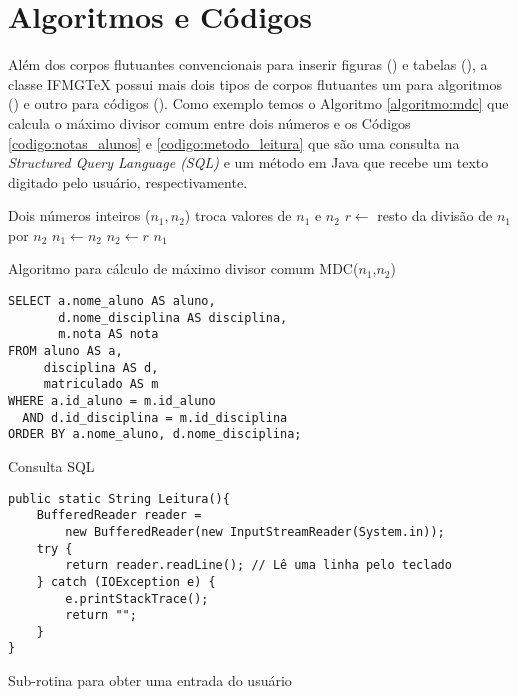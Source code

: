 \section{Algoritmos e Códigos} \label{secao:algoritmos_e_codigos}

Além dos corpos flutuantes convencionais para inserir figuras () e tabelas (), a classe {IFMG\TeX} possui mais dois tipos de corpos flutuantes um para algoritmos () e outro para códigos (). Como exemplo temos o Algoritmo \ref{algoritmo:mdc} que calcula o máximo divisor comum entre dois números e os Códigos \ref{codigo:notas_alunos} e \ref{codigo:metodo_leitura} que são uma consulta na \textit{Structured Query Language (SQL)} e um método em Java que recebe um texto digitado pelo usuário, respectivamente.

\begin{algoritmo}[!htb]
\begin{algorithmic}[1]
 \Require Dois números inteiros ($n_1, n_2$)
  
   \State troca valores de $n_1$ e $n_2$
 \EndIf
 \Repeat
   \State $r \leftarrow$ resto da divisão de $n_1$ por $n_2$
   \State $n_1 \leftarrow n_2$
   \State $n_2 \leftarrow r$
 \Return $n_1$
\end{algorithmic}
\caption{Algoritmo para cálculo de máximo divisor comum MDC($n_1$,$n_2$)} \label{algoritmo:mdc}
\end{algoritmo}

\begin{codigo}[!htb]
\begin{Verbatim}
SELECT a.nome_aluno AS aluno,
       d.nome_disciplina AS disciplina,
       m.nota AS nota
FROM aluno AS a,
     disciplina AS d,
     matriculado AS m
WHERE a.id_aluno = m.id_aluno
  AND d.id_disciplina = m.id_disciplina
ORDER BY a.nome_aluno, d.nome_disciplina;
\end{Verbatim}
\caption{Consulta SQL} \label{codigo:notas_alunos}
\end{codigo}

\begin{codigo}[!htb]
\begin{Verbatim}
public static String Leitura(){
    BufferedReader reader =
        new BufferedReader(new InputStreamReader(System.in));
    try {
        return reader.readLine(); // Lê uma linha pelo teclado
    } catch (IOException e) {
        e.printStackTrace();
        return "";
    }
}
\end{Verbatim}
\caption{Sub-rotina para obter uma entrada do usuário} \label{codigo:metodo_leitura}
\end{codigo}

